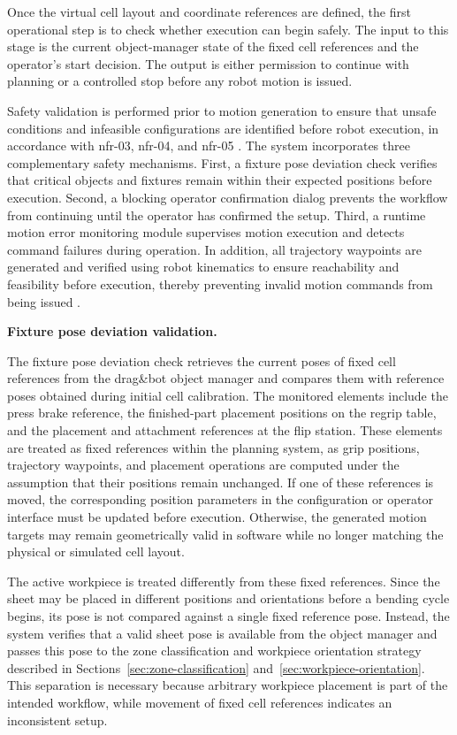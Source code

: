 Once the virtual cell layout and coordinate references are defined, the first operational step is to check whether execution can begin safely. The input to this stage is the current object-manager state of the fixed cell references and the operator's start decision. The output is either permission to continue with planning or a controlled stop before any robot motion is issued.

Safety validation is performed prior to motion generation to ensure that unsafe conditions and infeasible configurations are identified before robot execution, in accordance with \acs{nfr}-03, \acs{nfr}-04, and \acs{nfr}-05 \cite{Siciliano2016Robotics}. The system incorporates three complementary safety mechanisms. First, a fixture pose deviation check verifies that critical objects and fixtures remain within their expected positions before execution. Second, a blocking operator confirmation dialog prevents the workflow from continuing until the operator has confirmed the setup. Third, a runtime motion error monitoring module supervises motion execution and detects command failures during operation. In addition, all trajectory waypoints are generated and verified using robot kinematics to ensure reachability and feasibility before execution, thereby preventing invalid motion commands from being issued \cite{Siciliano2016Robotics}.

\label{subsec:fixture-pose-deviation-validation}
\noindent\textbf{Fixture pose deviation validation.}

The fixture pose deviation check retrieves the current poses of fixed cell references from the drag\&bot object manager and compares them with reference poses obtained during initial cell calibration. The monitored elements include the press brake reference, the finished-part placement positions on the regrip table, and the placement and attachment references at the flip station. These elements are treated as fixed references within the planning system, as grip positions, trajectory waypoints, and placement operations are computed under the assumption that their positions remain unchanged. If one of these references is moved, the corresponding position parameters in the configuration or operator interface must be updated before execution. Otherwise, the generated motion targets may remain geometrically valid in software while no longer matching the physical or simulated cell layout.

The active workpiece is treated differently from these fixed references. Since the sheet may be placed in different positions and orientations before a bending cycle begins, its pose is not compared against a single fixed reference pose. Instead, the system verifies that a valid sheet pose is available from the object manager and passes this pose to the zone classification and workpiece orientation strategy described in Sections~\ref{sec:zone-classification} and~\ref{sec:workpiece-orientation}. This separation is necessary because arbitrary workpiece placement is part of the intended workflow, while movement of fixed cell references indicates an inconsistent setup.

